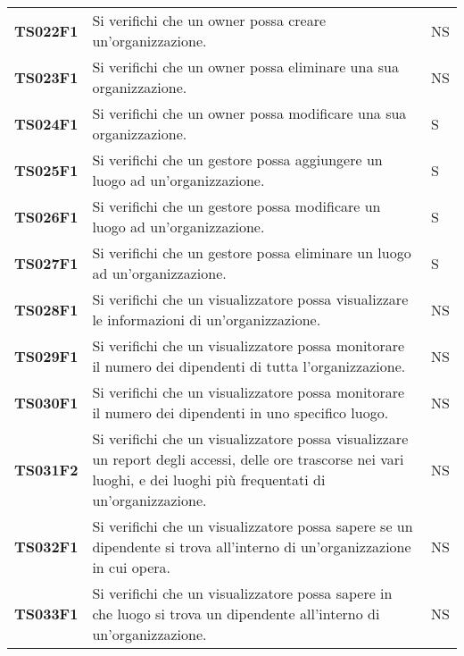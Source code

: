 \documentclass[../piano-di-qualifica.tex]{subfiles}
\begin{document}
\begin{longtable}[H]{>{\centering\bfseries}m{3cm} >{}m{10cm} >{\centering\arraybackslash}m{3cm}}
  TS022F1            & Si verifichi che un owner possa creare un'organizzazione. 
  & NS               \\

  TS023F1            & Si verifichi che un owner possa eliminare una sua organizzazione. 
  & NS               \\

  TS024F1            & Si verifichi che un owner possa modificare una sua organizzazione. 
  & S               \\
  
  TS025F1            & Si verifichi che un gestore possa aggiungere un luogo ad un'organizzazione. 
  & S               \\

  TS026F1            & Si verifichi che un gestore possa modificare un luogo ad un'organizzazione. 
  & S               \\

  TS027F1            & Si verifichi che un gestore possa eliminare un luogo ad un'organizzazione. 
  & S               \\

  TS028F1            & Si verifichi che un visualizzatore possa visualizzare le informazioni di un'organizzazione. 
  & NS               \\

  TS029F1            & Si verifichi che un visualizzatore possa monitorare il numero dei dipendenti di tutta l'organizzazione.
  & NS               \\

  TS030F1            & Si verifichi che un visualizzatore possa monitorare il numero dei dipendenti in uno specifico luogo.
  & NS               \\

  TS031F2            & Si verifichi che un visualizzatore possa visualizzare un report degli accessi, delle ore trascorse nei vari luoghi, e dei luoghi più frequentati di un'organizzazione.
  & NS               \\

  TS032F1            & Si verifichi che un visualizzatore possa sapere se un dipendente si trova all’interno di un’organizzazione in cui opera.
  & NS               \\

  TS033F1            & Si verifichi che un visualizzatore possa sapere in che luogo si trova un dipendente all'interno di un'organizzazione.
  & NS               \\


\end{longtable}
\end{document}
